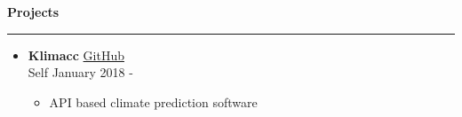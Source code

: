 \textbf{Projects} 
 \par\noindent\rule{\textwidth}{0.2pt} 
 \begin{itemize} \item {\textbf{Klimacc} \hfill \faGithub \hspace{.5pt} \href{www.google.com}{GitHub} \\ 
 Self \hfill {January 2018 - } 
 { 
 \begin{itemize} 
 \item {API based climate prediction software} 
 \end{itemize} 
 }} 
 \end{itemize}
